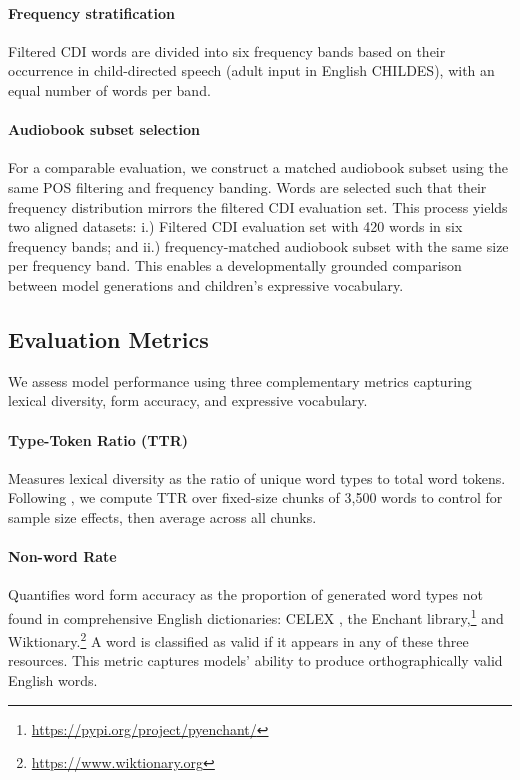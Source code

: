 \paragraph{Frequency stratification} Filtered CDI words are divided into six frequency bands based on their occurrence in child-directed speech (adult input in English CHILDES), with an equal number of words per band. 

\paragraph{Audiobook subset selection}

For a comparable evaluation, we construct a matched audiobook subset using the same POS filtering and frequency banding. Words are selected such that their frequency distribution mirrors the filtered CDI evaluation set. This process yields two aligned datasets: i.) Filtered CDI evaluation set with 420 words in six frequency bands; and ii.) frequency-matched audiobook subset with the same size per frequency band. This enables a developmentally grounded comparison between model generations and children’s expressive vocabulary.



\subsection{Evaluation Metrics}

We assess model performance using three complementary metrics capturing lexical diversity, form accuracy, and expressive vocabulary.


\paragraph{Type-Token Ratio (TTR)} Measures lexical diversity as the ratio of unique word types to total word tokens. Following \citet{rasanen2024age}, we compute TTR over fixed-size chunks of 3,500 words to control for sample size effects, then average across all chunks.

\paragraph{Non-word Rate} Quantifies word form accuracy as the proportion of generated word types not found in comprehensive English dictionaries: CELEX \citep{van2014subtlex}, the Enchant library,\footnote{\url{https://pypi.org/project/pyenchant/}} and Wiktionary.\footnote{\url{https://www.wiktionary.org}} A word is classified as valid if it appears in any of these three resources. This metric captures models' ability to produce orthographically valid English words.



